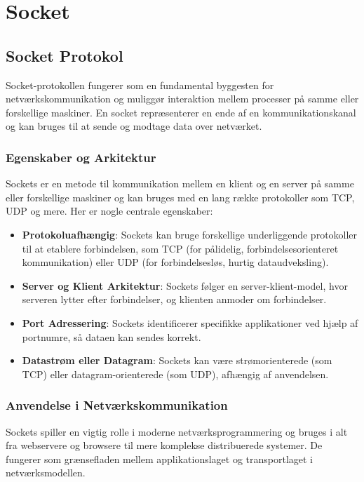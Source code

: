 \chapter{Socket}
\section{Socket Protokol}

Socket-protokollen fungerer som en fundamental byggesten for netværkskommunikation og muliggør interaktion mellem processer på samme eller forskellige maskiner. En socket repræsenterer en ende af en kommunikationskanal og kan bruges til at sende og modtage data over netværket.

\subsection*{Egenskaber og Arkitektur}
Sockets er en metode til kommunikation mellem en klient og en server på samme eller forskellige maskiner og kan bruges med en lang række protokoller som TCP, UDP og mere. Her er nogle centrale egenskaber:

\begin{itemize}
	\item \textbf{Protokoluafhængig}: Sockets kan bruge forskellige underliggende protokoller til at etablere forbindelsen, som TCP (for pålidelig, forbindelsesorienteret kommunikation) eller UDP (for forbindelsesløs, hurtig dataudveksling).
	\item \textbf{Server og Klient Arkitektur}: Sockets følger en server-klient-model, hvor serveren lytter efter forbindelser, og klienten anmoder om forbindelser.
	\item \textbf{Port Adressering}: Sockets identificerer specifikke applikationer ved hjælp af portnumre, så dataen kan sendes korrekt.
	\item \textbf{Datastrøm eller Datagram}: Sockets kan være strømorienterede (som TCP) eller datagram-orienterede (som UDP), afhængig af anvendelsen.
\end{itemize}

\subsection*{Anvendelse i Netværkskommunikation}
Sockets spiller en vigtig rolle i moderne netværksprogrammering og bruges i alt fra webservere og browsere til mere komplekse distribuerede systemer. De fungerer som grænsefladen mellem applikationslaget og transportlaget i netværksmodellen.

